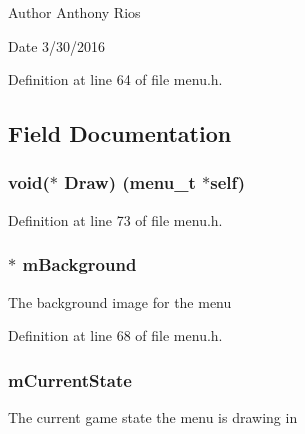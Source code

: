 \begin{DoxyAuthor}{Author}
Anthony Rios 
\end{DoxyAuthor}
\begin{DoxyDate}{Date}
3/30/2016 
\end{DoxyDate}


Definition at line 64 of file menu.\+h.



\subsection{Field Documentation}
\subsubsection[{\texorpdfstring{Draw}{Draw}}]{\setlength{\rightskip}{0pt plus 5cm}void($\ast$ Draw) ({\bf menu\+\_\+t} $\ast$self)}\hypertarget{structmenu__s_ab0d1e3b40626060280d7a069ef441961}{}\label{structmenu__s_ab0d1e3b40626060280d7a069ef441961}


Definition at line 73 of file menu.\+h.

\subsubsection[{\texorpdfstring{m\+Background}{mBackground}}]{$\ast$ m\+Background}\hypertarget{structmenu__s_ab2cdfd66047e062b1da2948d07f9f90d}{}\label{structmenu__s_ab2cdfd66047e062b1da2948d07f9f90d}
The background image for the menu 

Definition at line 68 of file menu.\+h.

\subsubsection[{\texorpdfstring{m\+Current\+State}{mCurrentState}}]{ m\+Current\+State}\hypertarget{structmenu__s_a0f4930e7bfb881141c55f2ff6532343c}{}\label{structmenu__s_a0f4930e7bfb881141c55f2ff6532343c}
The current game state the menu is drawing in 

